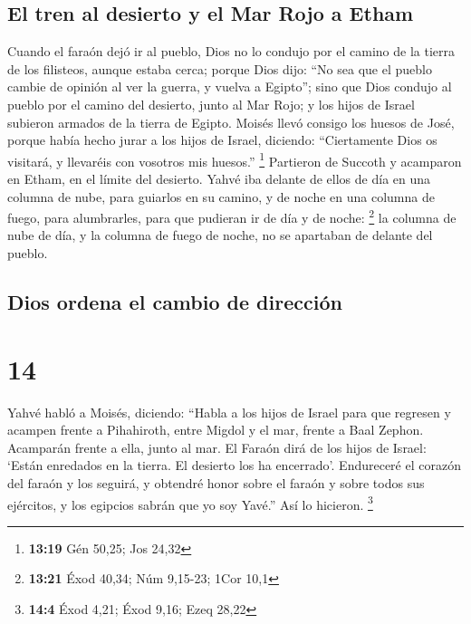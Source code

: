 \hypertarget{el-tren-al-desierto-y-el-mar-rojo-a-etham}{%
\subsection{El tren al desierto y el Mar Rojo a
Etham}\label{el-tren-al-desierto-y-el-mar-rojo-a-etham}}

 Cuando el faraón dejó ir al pueblo, Dios no lo condujo
por el camino de la tierra de los filisteos, aunque estaba cerca; porque
Dios dijo: ``No sea que el pueblo cambie de opinión al ver la guerra, y
vuelva a Egipto'';  sino que Dios condujo al pueblo por
el camino del desierto, junto al Mar Rojo; y los hijos de Israel
subieron armados de la tierra de Egipto.  Moisés llevó
consigo los huesos de José, porque había hecho jurar a los hijos de
Israel, diciendo: ``Ciertamente Dios os visitará, y llevaréis con
vosotros mis huesos.'' \footnote{\textbf{13:19} Gén 50,25; Jos 24,32}
 Partieron de Succoth y acamparon en Etham, en el límite
del desierto.  Yahvé iba delante de ellos de día en una
columna de nube, para guiarlos en su camino, y de noche en una columna
de fuego, para alumbrarles, para que pudieran ir de día y de noche:
\footnote{\textbf{13:21} Éxod 40,34; Núm 9,15-23; 1Cor 10,1}
 la columna de nube de día, y la columna de fuego de
noche, no se apartaban de delante del pueblo.

\hypertarget{dios-ordena-el-cambio-de-direcciuxf3n}{%
\subsection{Dios ordena el cambio de
dirección}\label{dios-ordena-el-cambio-de-direcciuxf3n}}

\hypertarget{section-13}{%
\section{14}\label{section-13}}

 Yahvé habló a Moisés, diciendo:  ``Habla a
los hijos de Israel para que regresen y acampen frente a Pihahiroth,
entre Migdol y el mar, frente a Baal Zephon. Acamparán frente a ella,
junto al mar.  El Faraón dirá de los hijos de Israel:
`Están enredados en la tierra. El desierto los ha encerrado'.
 Endureceré el corazón del faraón y los seguirá, y
obtendré honor sobre el faraón y sobre todos sus ejércitos, y los
egipcios sabrán que yo soy Yavé.'' Así lo hicieron. \footnote{\textbf{14:4}
  Éxod 4,21; Éxod 9,16; Ezeq 28,22}

